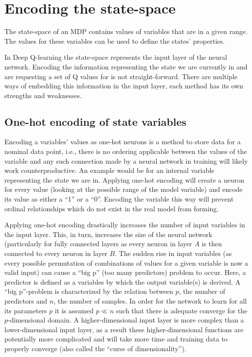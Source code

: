 \section{Encoding the state-space}

The state-space of an MDP contains values of variables that are in a given range. The values for these variables can be used to define the states' properties.

In Deep Q-learning the state-space represents the input layer of the neural network. Encoding the information representing the state we are currently in and are requesting a set of Q values for is not straight-forward. There are multiple ways of embedding this information in the input layer, each method has its own strengths and weaknesses.

\subsection{One-hot encoding of state variables}

Encoding a variables' values as one-hot neurons is a method to store data for a nominal data point, i.e., there is no ordering applicable between the values of the variable and any such connection made by a neural network in training will likely work counterproductive. An example would be for an internal variable representing the state we are in. Applying one-hot encoding will create a neuron for every value (looking at the possible range of the model variable) and encode its value as either a ``1'' or a ``0''. Encoding the variable this way will prevent ordinal relationships which do not exist in the real model from forming.

Applying one-hot encoding drastically increases the number of input variables in the input layer. This, in turn, increases the size of the neural network (particularly for fully connected layers as every neuron in layer $A$ is then connected to every neuron in layer $B$. The sudden rise in input variables (as every possible permutation of combinations of values for a given variable is now a valid input) can cause a ``big p'' (too many predictors) problem to occur. Here, a predictor is defined as a variables by which the output variable(s) is derived. A ``big p''-problem is characterized by the relation between $p$, the number of predictors and $n$, the number of samples. In order for the network to learn for all its parameters $p$ it is assumed $p \ll n$ such that there is adequate converge for the $p$-dimensional domain. A higher-dimensional input layer is more complex than a lower-dimensional input layer, as a result these higher-dimensional functions are potentially more complicated and will take more time and training data to properly converge (also called the ``curse of dimensionality'').


